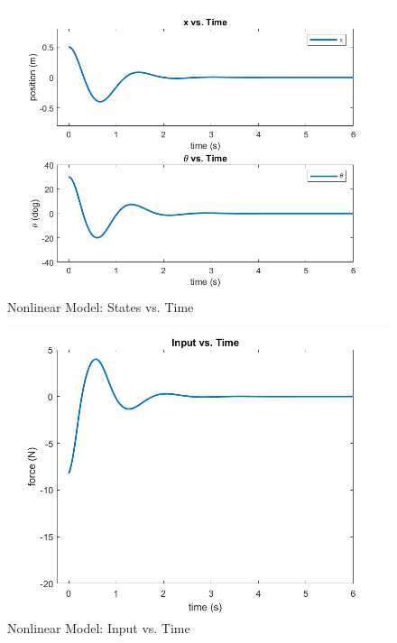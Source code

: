 \documentclass[12pt, letterpaper, onecolumn]{article}
\begin{document}
\begin{figure}[h!]
    \centering
    \includegraphics[width=\linewidth]{figs/p3-b-states.png}
    \caption{Nonlinear Model: States vs. Time}
    \label{}
\end{figure}

\begin{figure}[h!]
    \centering
    \includegraphics[width=\linewidth]{figs/p3-b-input.png}
    \caption{Nonlinear Model: Input vs. Time}
    \label{}
\end{figure}

\clearpage
\end{document}
